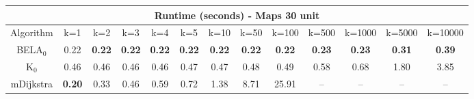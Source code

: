 \begin{tabular}{c|cccccccccccc}\toprule
\multicolumn{13}{c}{Runtime (seconds) - Maps 30 unit}\\ \midrule
Algorithm & k=1 & k=2 & k=3 & k=4 & k=5 & k=10 & k=50 & k=100 & k=500 & k=1000 & k=5000 & k=10000 \\ \midrule
BELA$_0$ & 0.22 & \textbf{0.22} & \textbf{0.22} & \textbf{0.22} & \textbf{0.22} & \textbf{0.22} & \textbf{0.22} & \textbf{0.22} & \textbf{0.23} & \textbf{0.23} & \textbf{0.31} & \textbf{0.39} \\
K$_0$ & 0.46 & 0.46 & 0.46 & 0.46 & 0.47 & 0.47 & 0.48 & 0.49 & 0.58 & 0.68 & 1.80 & 3.85 \\
mDijkstra & \textbf{0.20} & 0.33 & 0.46 & 0.59 & 0.72 & 1.38 & 8.71 & 25.91 & -- & -- & -- & -- \\ \bottomrule 
\end{tabular}
